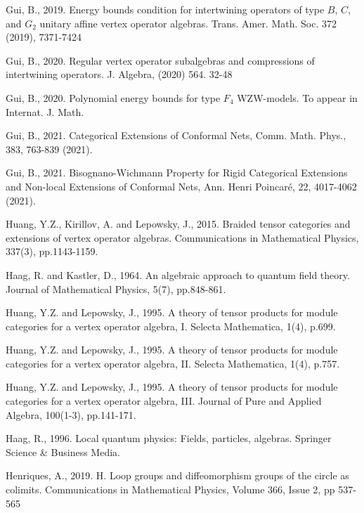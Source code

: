 \documentclass[12pt,a4paper]{article}
\theoremstyle{definition}
\theoremstyle{plain}
\numberwithin{equation}{subsection}
\begin{document}
\begin{thebibliography}{999999}
Gui, B., 2019. Energy bounds condition for intertwining operators of type $ B $, $ C $, and $ G_2 $ unitary affine vertex operator algebras. Trans. Amer. Math. Soc. 372 (2019), 7371-7424



Gui, B., 2020. Regular vertex operator subalgebras and compressions of intertwining operators. J. Algebra, (2020) 564. 32-48

Gui, B., 2020. Polynomial energy bounds for type $F_4$ WZW-models. To appear in Internat. J. Math.

Gui, B., 2021. Categorical Extensions of Conformal Nets, Comm. Math. Phys., 383, 763-839 (2021).

Gui, B., 2021. Bisognano-Wichmann Property for Rigid Categorical Extensions and Non-local Extensions of Conformal Nets, Ann. Henri Poincaré, 22, 4017-4062 (2021).

Huang, Y.Z., Kirillov, A. and Lepowsky, J., 2015. Braided tensor categories and extensions of vertex operator algebras. Communications in Mathematical Physics, 337(3), pp.1143-1159.

Haag, R. and Kastler, D., 1964. An algebraic approach to quantum field theory. Journal of Mathematical Physics, 5(7), pp.848-861.





Huang, Y.Z. and Lepowsky, J., 1995. A theory of tensor products for module categories for a vertex operator algebra, I. Selecta Mathematica, 1(4), p.699.

Huang, Y.Z. and Lepowsky, J., 1995. A theory of tensor products for module categories for a vertex operator algebra, II. Selecta Mathematica, 1(4), p.757.

Huang, Y.Z. and Lepowsky, J., 1995. A theory of tensor products for module categories for a vertex operator algebra, III. Journal of Pure and Applied Algebra, 100(1-3), pp.141-171.


Haag, R., 1996. Local quantum physics: Fields, particles, algebras. Springer Science \& Business Media.

Henriques, A., 2019. H. Loop groups and diffeomorphism groups of the circle as colimits. Communications in Mathematical Physics,  Volume 366, Issue 2, pp 537-565


\end{thebibliography}
\end{document}
